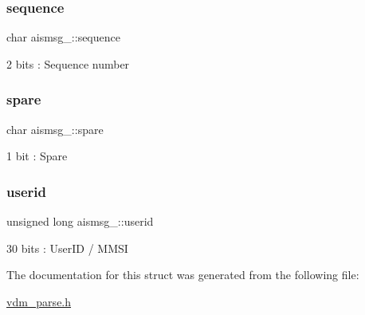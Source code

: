 \mbox{\label{structaismsg__6_ae08724a1cd338cf62c3fbef505d920ff}} 
\subsubsection{\texorpdfstring{sequence}{sequence}}
{\footnotesize\ttfamily char aismsg\+\_\+::sequence}



2 bits \+: Sequence number 

\mbox{\label{structaismsg__6_a02e2f42ebc0a40f12ddf478b4920ebe7}} 
\subsubsection{\texorpdfstring{spare}{spare}}
{\footnotesize\ttfamily char aismsg\+\_\+::spare}



1 bit \+: Spare 

\mbox{\label{structaismsg__6_af0d49825cc9197fe5e9d04bf61abf812}} 
\subsubsection{\texorpdfstring{userid}{userid}}
{\footnotesize\ttfamily unsigned long aismsg\+\_\+::userid}



30 bits \+: User\+ID / M\+M\+SI 



The documentation for this struct was generated from the following file\+:\begin{DoxyCompactItemize}
\item 
\mbox{\hyperlink{vdm__parse_8h}{vdm\+\_\+parse.\+h}}\end{DoxyCompactItemize}

